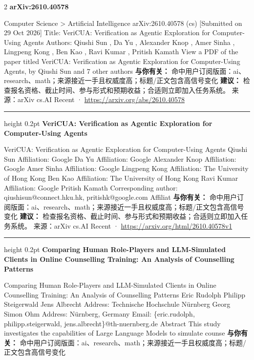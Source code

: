 \documentclass[10.5pt]{ctexart}
\begin{document}
\begin{multicols}{2}
{\large\bfseries arXiv:2610.40578}\par
Computer Science > Artificial Intelligence arXiv:2610.40578 (cs) [Submitted on 29 Oct 2026] Title: VeriCUA: Verification as Agentic Exploration for Computer-Using Agents Authors: Qiushi Sun , Da Yu , Alexander Knop , Amer Sinha , Lingpeng Kong , Ben Kao , Ravi Kumar , Pritish Kamath View a PDF of the paper titled VeriCUA: Verification as Agentic Exploration for Computer-Using Agents, by Qiushi Sun and 7 other authors
\textbf{与你有关：} 命中用户订阅版面：ai、research、math；来源接近一手且权威度高；标题/正文包含高信号变化
\textbf{建议：} 检查报名资格、截止时间、参与形式和预期收益；合适则立即加入任务系统。
{\footnotesize\color{ormuted} 来源：arXiv cs.AI Recent · \url{https://arxiv.org/abs/2610.40578}}
\vspace{2mm}
\hrule height 0.2pt
\vspace{2mm}
{\large\bfseries VeriCUA: Verification as Agentic Exploration for Computer-Using Agents}\par
VeriCUA: Verification as Agentic Exploration for Computer-Using Agents Qiushi Sun Affiliation: Google Da Yu Affiliation: Google Alexander Knop Affiliation: Google Amer Sinha Affiliation: Google Lingpeng Kong Affiliation: The University of Hong Kong Ben Kao Affiliation: The University of Hong Kong Ravi Kumar Affiliation: Google Pritish Kamath Corresponding author: qiushisun@connect.hku.hk, pritishk@google.com Affiliat
\textbf{与你有关：} 命中用户订阅版面：ai、research、math；来源接近一手且权威度高；标题/正文包含高信号变化
\textbf{建议：} 检查报名资格、截止时间、参与形式和预期收益；合适则立即加入任务系统。
{\footnotesize\color{ormuted} 来源：arXiv cs.AI Recent · \url{https://arxiv.org/html/2610.40578v1}}
\vspace{2mm}
\hrule height 0.2pt
\vspace{2mm}
{\large\bfseries Comparing Human Role-Players and LLM-Simulated Clients in Online Counselling Training: An Analysis of Counselling Patterns}\par
Comparing Human Role-Players and LLM-Simulated Clients in Online Counselling Training: An Analysis of Counselling Patterns Eric Rudolph Philipp Steigerwald Jens Albrecht Address: Technische Hochschule Nürnberg Georg Simon Ohm Address: Nürnberg, Germany Email: \{eric.rudolph, philipp.steigerwald, jens.albrecht\}@th-nuernberg.de Abstract This study investigates the capabilities of Large Language Models to simulate counse
\textbf{与你有关：} 命中用户订阅版面：ai、research、math；来源接近一手且权威度高；标题/正文包含高信号变化

\end{multicols}
\end{document}
